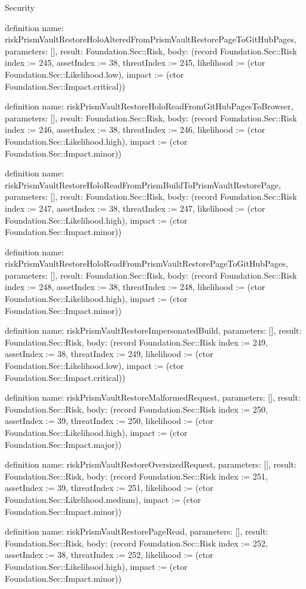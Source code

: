 \begin{lexlean}{Security}
\begin{semanticmodule}
definition{
  name: riskPrismVaultRestoreHoloAlteredFromPrismVaultRestorePageToGitHubPages,
  parameters: [],
  result: Foundation.Sec::Risk,
  body: (record Foundation.Sec::Risk {index := 245, assetIndex := 38, threatIndex := 245, likelihood := (ctor Foundation.Sec::Likelihood.low), impact := (ctor Foundation.Sec::Impact.critical)})
}

definition{
  name: riskPrismVaultRestoreHoloReadFromGitHubPagesToBrowser,
  parameters: [],
  result: Foundation.Sec::Risk,
  body: (record Foundation.Sec::Risk {index := 246, assetIndex := 38, threatIndex := 246, likelihood := (ctor Foundation.Sec::Likelihood.high), impact := (ctor Foundation.Sec::Impact.minor)})
}

definition{
  name: riskPrismVaultRestoreHoloReadFromPrismBuildToPrismVaultRestorePage,
  parameters: [],
  result: Foundation.Sec::Risk,
  body: (record Foundation.Sec::Risk {index := 247, assetIndex := 38, threatIndex := 247, likelihood := (ctor Foundation.Sec::Likelihood.high), impact := (ctor Foundation.Sec::Impact.minor)})
}

definition{
  name: riskPrismVaultRestoreHoloReadFromPrismVaultRestorePageToGitHubPages,
  parameters: [],
  result: Foundation.Sec::Risk,
  body: (record Foundation.Sec::Risk {index := 248, assetIndex := 38, threatIndex := 248, likelihood := (ctor Foundation.Sec::Likelihood.high), impact := (ctor Foundation.Sec::Impact.minor)})
}

definition{
  name: riskPrismVaultRestoreImpersonatedBuild,
  parameters: [],
  result: Foundation.Sec::Risk,
  body: (record Foundation.Sec::Risk {index := 249, assetIndex := 38, threatIndex := 249, likelihood := (ctor Foundation.Sec::Likelihood.low), impact := (ctor Foundation.Sec::Impact.critical)})
}

definition{
  name: riskPrismVaultRestoreMalformedRequest,
  parameters: [],
  result: Foundation.Sec::Risk,
  body: (record Foundation.Sec::Risk {index := 250, assetIndex := 39, threatIndex := 250, likelihood := (ctor Foundation.Sec::Likelihood.high), impact := (ctor Foundation.Sec::Impact.major)})
}

definition{
  name: riskPrismVaultRestoreOversizedRequest,
  parameters: [],
  result: Foundation.Sec::Risk,
  body: (record Foundation.Sec::Risk {index := 251, assetIndex := 39, threatIndex := 251, likelihood := (ctor Foundation.Sec::Likelihood.medium), impact := (ctor Foundation.Sec::Impact.minor)})
}

definition{
  name: riskPrismVaultRestorePageRead,
  parameters: [],
  result: Foundation.Sec::Risk,
  body: (record Foundation.Sec::Risk {index := 252, assetIndex := 38, threatIndex := 252, likelihood := (ctor Foundation.Sec::Likelihood.high), impact := (ctor Foundation.Sec::Impact.minor)})
}


\end{semanticmodule}
\end{lexlean}
